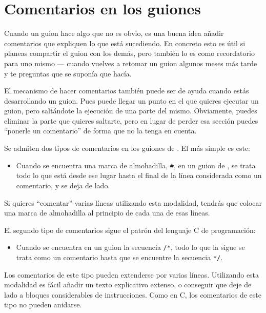 \chapter{Comentarios en los guiones}
\label{chap:comments}

Cuando un guion hace algo que no es obvio, es una buena idea añadir
comentarios que expliquen lo que está sucediendo. En concreto esto es
útil si planeas compartir el guion con los demás, pero también lo es
como recordatorio para uno mismo --- cuando vuelves a retomar un guion
algunos meses más tarde y te preguntas que se suponía que hacía.

El mecanismo de hacer comentarios también puede ser de ayuda cuando estás
desarrollando un guion. Pues puede llegar un punto en el que quieres
ejecutar un guion, pero saltándote la ejecución de una parte del mismo.
Obviamente, puedes eliminar la parte que quieres saltarte, pero en lugar
de perder esa sección puedes ``ponerle un comentario'' de forma que
 no la tenga en cuenta.

Se admiten dos tipos de comentarios en los guiones de .
El más simple es este:

\begin{itemize}
\item Cuando se encuentra una marca de almohadilla, \texttt{\#}, en un
  guion de , se trata todo lo que está desde ese lugar hasta
  el final de la línea considerada como un comentario, y se deja de lado.
\end{itemize}

Si quieres ``comentar'' varias líneas utilizando esta modalidad, tendrás
que colocar una marca de almohadilla al principio de cada una de esas líneas.

El segundo tipo de comentarios sigue el patrón del lenguaje C de programación:

\begin{itemize}
\item Cuando se encuentra en un guion la secuencia \texttt{/*}, todo
  lo que la sigue se trata como un comentario hasta que se encuentre la
  secuencia \texttt{*/}.
\end{itemize}

Los comentarios de este tipo pueden extenderse por varias líneas. Utilizando
esta modalidad es fácil añadir un texto explicativo extenso, o conseguir
que  deje de lado a bloques considerables de instrucciones. Como
en C, los comentarios de este tipo no pueden anidarse.

